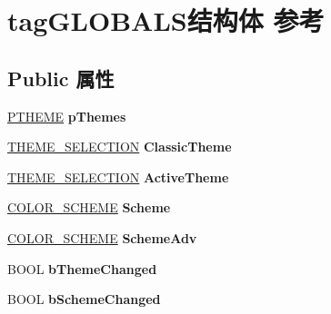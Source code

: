 \hypertarget{structtag_g_l_o_b_a_l_s}{}\section{tag\+G\+L\+O\+B\+A\+L\+S结构体 参考}
\label{structtag_g_l_o_b_a_l_s}
\subsection*{Public 属性}
\begin{DoxyCompactItemize}
\item 
\mbox{\label{structtag_g_l_o_b_a_l_s_a0998261738cb940baf8bcc3abbba888e}} 
\hyperlink{struct___t_h_e_m_e}{P\+T\+H\+E\+ME} {\bfseries p\+Themes}
\item 
\mbox{\label{structtag_g_l_o_b_a_l_s_a42a0302d63870e14291bec871501baa2}} 
\hyperlink{struct___t_h_e_m_e___s_e_l_e_c_t_i_o_n}{T\+H\+E\+M\+E\+\_\+\+S\+E\+L\+E\+C\+T\+I\+ON} {\bfseries Classic\+Theme}
\item 
\mbox{\label{structtag_g_l_o_b_a_l_s_acb50e733feb57bea534578095891b2c6}} 
\hyperlink{struct___t_h_e_m_e___s_e_l_e_c_t_i_o_n}{T\+H\+E\+M\+E\+\_\+\+S\+E\+L\+E\+C\+T\+I\+ON} {\bfseries Active\+Theme}
\item 
\mbox{\label{structtag_g_l_o_b_a_l_s_aebca3d2ac5737bec0fbff7ca2020cb4e}} 
\hyperlink{struct_c_o_l_o_r___s_c_h_e_m_e}{C\+O\+L\+O\+R\+\_\+\+S\+C\+H\+E\+ME} {\bfseries Scheme}
\item 
\mbox{\label{structtag_g_l_o_b_a_l_s_a39c41559d38ed598523e4dfe7ee92534}} 
\hyperlink{struct_c_o_l_o_r___s_c_h_e_m_e}{C\+O\+L\+O\+R\+\_\+\+S\+C\+H\+E\+ME} {\bfseries Scheme\+Adv}
\item 
\mbox{\label{structtag_g_l_o_b_a_l_s_a56d365424c5d4d783dbe6822fe888ab8}} 
B\+O\+OL {\bfseries b\+Theme\+Changed}
\item 
\mbox{\label{structtag_g_l_o_b_a_l_s_a96d6968d79b682cb6b66d2acaecfb0f7}} 
B\+O\+OL {\bfseries b\+Scheme\+Changed}
\item 
\mbox{\label{structtag_g_l_o_b_a_l_s_a3594bae416b4acf896e47b911b893c2e}} 

\end{DoxyCompactItemize}
